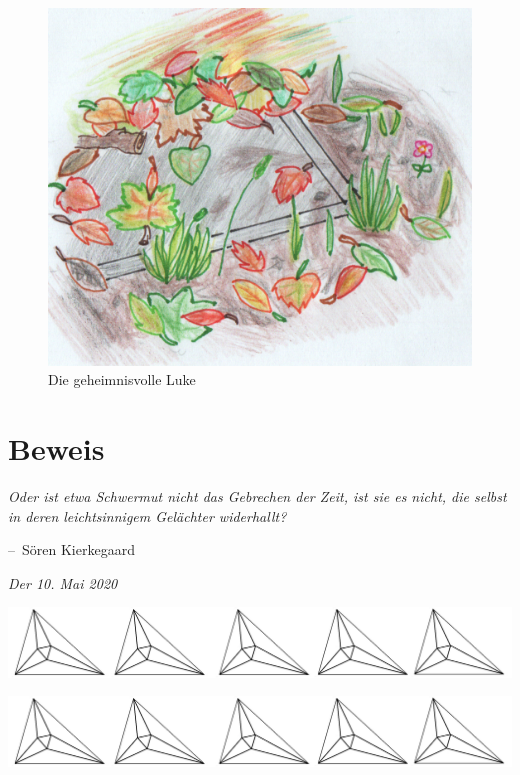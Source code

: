 \documentclass[oneside]{memoir}
\makeatletter
\newcommand{\parasep}{
\bigskip
\bigskip
\begin{center} 
   \includegraphics[scale=.08]{parasep5.jpg} 
\end{center}
\bigskip
\bigskip
}
\newenvironment{chapquote}[2][2em]
  {\setlength{\@tempdima}{#1}%
   \def\chapquote@author{#2}%
   \parshape 1 \@tempdima \dimexpr\textwidth-2\@tempdima\relax%
   \itshape}
  {\par\normalfont\hfill--\ \chapquote@author\hspace*{\@tempdima}\par\bigskip}
\makeatother
\begin{document}
\begin{figure}[htbp] 
  \centering
     \includegraphics[scale=0.7]{Bilder/luke1.png}
  \caption{Die geheimnisvolle Luke}
\end{figure}


\chapter{Beweis} %
\begin{chapquote}{Sören Kierkegaard}
\glqq Oder ist etwa Schwermut nicht das Gebrechen der Zeit, ist sie es nicht, die selbst in deren leichtsinnigem Gelächter widerhallt?\grqq
\end{chapquote}

\textit{Der 10. Mai 2020} \\
     
\parasep

     
\parasep
\end{document}
